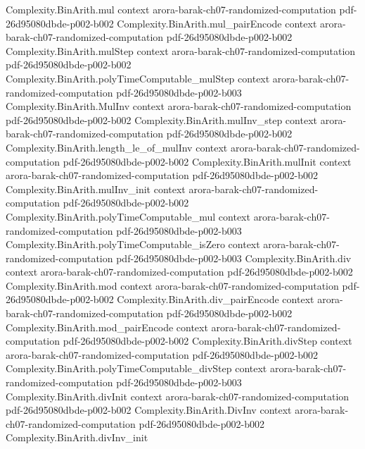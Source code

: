 \begin{theorem}
\proofstep
  {Complexity.BinArith.mul}
  {context}
  {arora-barak-ch07-randomized-computation}
  {pdf-26d95080dbde-p002-b002}
\proofstep
  {Complexity.BinArith.mul_pairEncode}
  {context}
  {arora-barak-ch07-randomized-computation}
  {pdf-26d95080dbde-p002-b002}
\proofstep
  {Complexity.BinArith.mulStep}
  {context}
  {arora-barak-ch07-randomized-computation}
  {pdf-26d95080dbde-p002-b002}
\proofstep
  {Complexity.BinArith.polyTimeComputable_mulStep}
  {context}
  {arora-barak-ch07-randomized-computation}
  {pdf-26d95080dbde-p002-b003}
\proofstep
  {Complexity.BinArith.MulInv}
  {context}
  {arora-barak-ch07-randomized-computation}
  {pdf-26d95080dbde-p002-b002}
\proofstep
  {Complexity.BinArith.mulInv_step}
  {context}
  {arora-barak-ch07-randomized-computation}
  {pdf-26d95080dbde-p002-b002}
\proofstep
  {Complexity.BinArith.length_le_of_mulInv}
  {context}
  {arora-barak-ch07-randomized-computation}
  {pdf-26d95080dbde-p002-b002}
\proofstep
  {Complexity.BinArith.mulInit}
  {context}
  {arora-barak-ch07-randomized-computation}
  {pdf-26d95080dbde-p002-b002}
\proofstep
  {Complexity.BinArith.mulInv_init}
  {context}
  {arora-barak-ch07-randomized-computation}
  {pdf-26d95080dbde-p002-b002}
\proofstep
  {Complexity.BinArith.polyTimeComputable_mul}
  {context}
  {arora-barak-ch07-randomized-computation}
  {pdf-26d95080dbde-p002-b003}
\proofstep
  {Complexity.BinArith.polyTimeComputable_isZero}
  {context}
  {arora-barak-ch07-randomized-computation}
  {pdf-26d95080dbde-p002-b003}
\proofstep
  {Complexity.BinArith.div}
  {context}
  {arora-barak-ch07-randomized-computation}
  {pdf-26d95080dbde-p002-b002}
\proofstep
  {Complexity.BinArith.mod}
  {context}
  {arora-barak-ch07-randomized-computation}
  {pdf-26d95080dbde-p002-b002}
\proofstep
  {Complexity.BinArith.div_pairEncode}
  {context}
  {arora-barak-ch07-randomized-computation}
  {pdf-26d95080dbde-p002-b002}
\proofstep
  {Complexity.BinArith.mod_pairEncode}
  {context}
  {arora-barak-ch07-randomized-computation}
  {pdf-26d95080dbde-p002-b002}
\proofstep
  {Complexity.BinArith.divStep}
  {context}
  {arora-barak-ch07-randomized-computation}
  {pdf-26d95080dbde-p002-b002}
\proofstep
  {Complexity.BinArith.polyTimeComputable_divStep}
  {context}
  {arora-barak-ch07-randomized-computation}
  {pdf-26d95080dbde-p002-b003}
\proofstep
  {Complexity.BinArith.divInit}
  {context}
  {arora-barak-ch07-randomized-computation}
  {pdf-26d95080dbde-p002-b002}
\proofstep
  {Complexity.BinArith.DivInv}
  {context}
  {arora-barak-ch07-randomized-computation}
  {pdf-26d95080dbde-p002-b002}
\proofstep
  {Complexity.BinArith.divInv_init}

\end{theorem}
